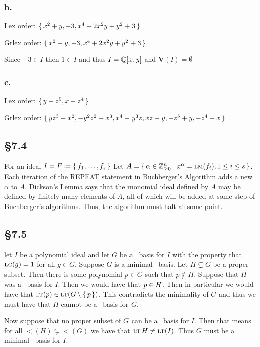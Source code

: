 \documentclass[letterpaper]{article}
\begin{document}
\subsubsection*{b.}

Lex order: $\set{x^{2} + y, -3, x^{4} + 2 x^{2} y + y^{2} + 3}$

Grlex order: $\set{x^{2} + y, -3, x^{4} + 2 x^{2} y + y^{2} + 3}$

Since $-3 \in I$ then $1 \in I$ and thus $I = \Q\bqty{x, y}$ and $\textbf{V}(I) = \emptyset$

\subsubsection*{c.}

Lex order: $\set{y - z^{5}, x - z^{4}}$

Grlex order: $\set{y z^{3} - x^{2}, -y^{2} z^{2} + x^{3}, x^{4} - y^{3} z, x z - y, -z^{5} + y, -z^{4} + x}$

\subsection*{\S 7.4}

For an ideal $I = \ideal{F \defeq \set{f_{1}, \ldots, f_{s}}}$
Let $A = \set{\alpha \in \mathbb{Z}_{\geq 0}^{n} | x^{\alpha} = \operatorname{\textsc{lm}}(f_{i}), 1 \leq i \leq s}$.
Each iteration of the REPEAT statement in Buchberger's Algorithm adds a new $\alpha$ to $A$.
Dickson's Lemma says that the monomial ideal defined by $A$ may be defined by finitely many elements of $A$, all of which will be added at some step of Buchberger's algorithms.
Thus, the algorithm must halt at some point.

\subsection*{\S 7.5}

let $I$ be a polynomial ideal and let $G$ be a \Grobner\ basis for $I$ with the property that $\operatorname{\textsc{lc}}(g) = 1$ for all $g \in G$.
Suppose $G$ is a minimal \Grobner\ basis.
Let $H \subsetneq G$ be a proper subset.
Then there is some polynomial $p \in G$ such that $p \notin H$.
Suppose that $H$ was a \Grobner\ basis for $I$.
Then we would have that $p \in \gen{H}$.
Then in particular we would have that $\lt(p) \in \gen{\lt(G \setminus \set{p})}$.
This contradicts the minimality of $G$ and thus we must have that $H$ cannot be a \Grobner\ basis for $G$.

Now suppose that no proper subset of $G$ can be a \Grobner\ basis for $I$.
Then that means for all $\lt(H) \subsetneq \lt(G)$ we have that $\gen{\lt{H}} \neq \gen{\lt(I)}$.
Thus $G$ must be a minimal \Grobner\ basis for $I$.
\end{document}
